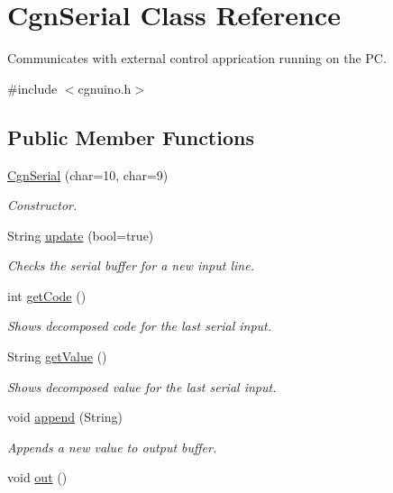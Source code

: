 \hypertarget{classCgnSerial}{}\section{Cgn\+Serial Class Reference}
\label{classCgnSerial}


Communicates with external control apprication running on the PC.  




{\ttfamily \#include $<$cgnuino.\+h$>$}

\subsection*{Public Member Functions}
\begin{DoxyCompactItemize}
\item 
\hyperlink{classCgnSerial_ab21e7431bdfa6219f78dcb6298798c8d}{Cgn\+Serial} (char=10, char=9)
\begin{DoxyCompactList}\small\item\em Constructor. \end{DoxyCompactList}\item 
String \hyperlink{classCgnSerial_a06cc8201d8ca8484410cb3a3767f0999}{update} (bool=true)
\begin{DoxyCompactList}\small\item\em Checks the serial buffer for a new input line. \end{DoxyCompactList}\item 
int \hyperlink{classCgnSerial_a7df12e17883f734dfbba8706773b050e}{get\+Code} ()\hypertarget{classCgnSerial_a7df12e17883f734dfbba8706773b050e}{}\label{classCgnSerial_a7df12e17883f734dfbba8706773b050e}

\begin{DoxyCompactList}\small\item\em Shows decomposed code for the last serial input. \end{DoxyCompactList}\item 
String \hyperlink{classCgnSerial_a6b482d7fd53a7474a541409629aa861d}{get\+Value} ()\hypertarget{classCgnSerial_a6b482d7fd53a7474a541409629aa861d}{}\label{classCgnSerial_a6b482d7fd53a7474a541409629aa861d}

\begin{DoxyCompactList}\small\item\em Shows decomposed value for the last serial input. \end{DoxyCompactList}\item 
void \hyperlink{classCgnSerial_ac420456d7efc9ae4141f641e407cec2a}{append} (String)
\begin{DoxyCompactList}\small\item\em Appends a new value to output buffer. \end{DoxyCompactList}\item 
void \hyperlink{classCgnSerial_a48af760c371fe83275811b11638abfa0}{out} ()\hypertarget{classCgnSerial_a48af760c371fe83275811b11638abfa0}{}\label{classCgnSerial_a48af760c371fe83275811b11638abfa0}


\end{DoxyCompactItemize}
